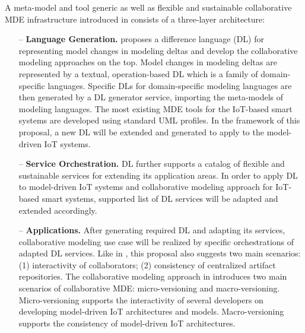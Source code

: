 A meta-model and tool generic as well as flexible and sustainable \cite{jelschen+2016} collaborative MDE infrastructure introduced in \cite{Kuryazov+2018} consists of a three-layer architecture:
\begin{itemize}
\item[--] \textbf{Language Generation.} \cite{Kuryazov+2018} proposes a difference language (DL) for representing model changes in modeling deltas and develop the collaborative modeling approaches on the top. Model changes in modeling deltas are represented by a textual, operation-based DL which is a family of domain-specific languages. Specific DLs for domain-specific modeling languages are then generated by a DL generator service, importing the meta-models of modeling languages. The most existing MDE tools for the IoT-based smart systems are developed using standard UML profiles. In the framework of this proposal, a new DL will be extended and generated to apply to the model-driven IoT systems.
\item[--] \textbf{Service Orchestration.} DL further supports a catalog of flexible and sustainable services for extending its application areas. In order to apply DL to model-driven IoT systems and collaborative modeling approach for IoT-based smart systems, supported list of DL services will be adapted and extended accordingly.
\item[--] \textbf{Applications.} After generating required DL and adapting its services, collaborative modeling use case will be realized by specific orchestrations of adapted DL services. Like in \cite{Kuryazov+2018}, this proposal also suggests two main scenarios: (1) interactivity of collaborators; (2) consistency of centralized artifact repositories. The collaborative modeling approach in \cite{Kuryazov+2018} introduces two main scenarios of collaborative MDE: micro-versioning and macro-versioning. Micro-versioning supports the interactivity of several developers on developing model-driven IoT architectures and models. Macro-versioning supports the consistency of model-driven IoT architectures.
\end{itemize}
